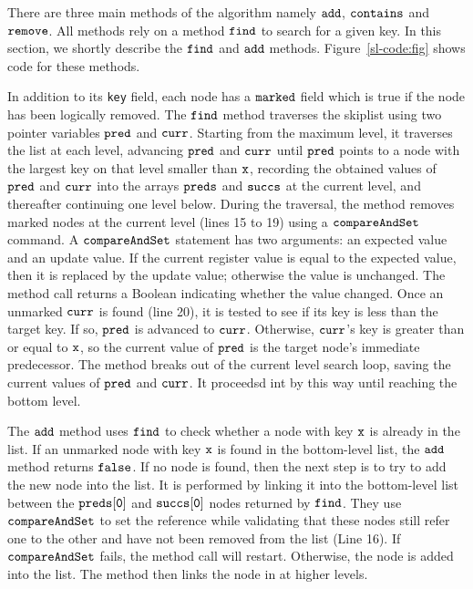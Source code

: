 There are three main methods of the algorithm namely $\tt add$, $\tt contains$ and $\tt remove$. All methods rely on a method $\tt find$ to search for a given key. In this section, we shortly describe the $\tt find$ and $\tt add$ methods.
Figure~\ref{sl-code:fig} shows code for these methods.




In addition to its {\tt key} field, each node has a $\tt marked$ field which is true if the node has been logically removed.
The $\tt find$ method traverses the skiplist using two pointer variables $\tt pred$ and $\tt curr$. Starting from the maximum level, it traverses the list
at each level, advancing $\tt pred$ and $\tt curr$ until $\tt pred$ points to a node with the largest key on that level smaller than $\tt x$, recording the
obtained values of  $\tt pred$ and $\tt curr$ into the arrays
$\tt preds$ and $\tt succs$ at the current level, and thereafter
continuing one level below.
During the traversal, the method removes marked nodes at the current level
(lines 15 to 19) using a $\tt compareAndSet$ command. A  $\tt compareAndSet$ statement has two arguments:  an expected value and an update value. If the current register value is equal to the expected value, then it is replaced by the update value; otherwise the value is unchanged. 
The method call returns a Boolean indicating whether the value changed. Once an unmarked $\tt curr$ is found (line 20), it is tested to see if its key is less than the target key. If so, $\tt pred$ is advanced to $\tt curr$. Otherwise, $\tt curr$'s key is greater than or equal to $\tt x$, so the current value
of $\tt pred$ is the target node's immediate predecessor. The method breaks out of the current level search loop, saving the current values of $\tt pred$ and $\tt curr$. It proceedsd int by this way until reaching the bottom level.

The $\tt add$ method uses $\tt find$ to check whether a node with key $\tt x$ is already in the list. If an unmarked node with key $\tt x$ is found in the bottom-level list, the $\tt add$ method returns $\tt false$. If no node is found, then the next step is to try to add the new node into the list. It is performed by linking it into the bottom-level list between the $\tt preds[0]$ and $\tt succs[0]$ nodes returned by $\tt find$. They use $\tt compareAndSet$ to set the reference while validating that these nodes still refer one to the other and have not been removed from the list (Line 16). If $\tt compareAndSet$ fails, the method call will restart. Otherwise, the node is added into the list. The method then links the node in at higher levels.  
 
